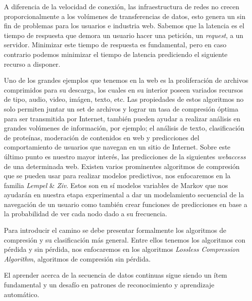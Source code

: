 A diferencia de la velocidad de conexión, las infraestructura de redes no crecen proporcionalmente a los volúmenes de transferencias de datos, esto genera un sin fin de problemas para los usuarios e industria web. Sabemos que la latencia es el tiempo de respuesta que demora un usuario hacer una petición, un \emph{request}, a un servidor. Minimizar este tiempo de respuesta es fundamental, pero en caso contrario podemos minimizar el tiempo de latencia prediciendo el siguiente recurso a disponer.
 
Uno de los grandes ejemplos que tenemos en la web es la proliferación de archivos comprimidos para su descarga, los cuales en su interior poseen variados recursos de tipo, audio, video, imágen, texto, etc. Las propiedades de estos algoritmos no solo permiten juntar un set de archivos y lograr un tasa de compresión óptima para ser transmitida por Internet, también pueden ayudar a realizar análisis en grandes volúmenes de información, por ejemplo; el análisis de texto, clasificación de proteínas, moderación de contenidos en web y predicciones del comportamiento de usuarios que navegan en un sitio de Internet. Sobre este último punto es nuestro mayor interés, las predicciones de la siguientes \emph{webaccess} de una determinada web. Existen varios prominentes algoritmos de compresión que se pueden usar para realizar modelos predictivos, nos enfocaremos en la familia \emph{Lempel} {\&} \emph{Ziv}. Estos son en sí modelos variables de Markov que nos ayudarán en nuestra etapa experimental a dar un modelamiento secuencial de la navegación de un usuario como también crear funciones de predicciones en base a la probabilidad de ver cada nodo dado a su frecuencia.

Para introducir el camino se debe presentar formalmente los algoritmos de compresión y su clasificación más general. Entre ellos tenemos los algoritmos con pérdida y sin pérdida, nos enfocaremos en los algoritmos \emph{Lossless Compression Algorithm}, algoritmos de compresión sin pérdida.


El aprender acerca de la secuencia de datos continuas sigue siendo un ítem fundamental y un desafío en patrones de reconocimiento y aprendizaje automático.






